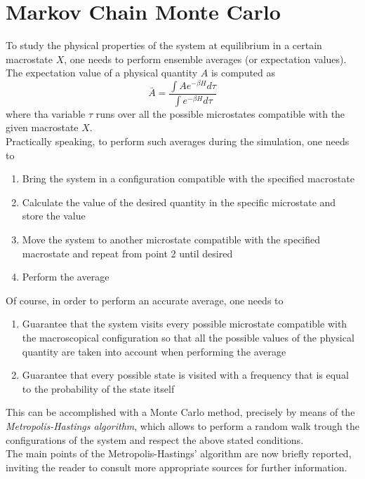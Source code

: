 \section{Markov Chain Monte Carlo}
\label{sec:MCMC}
To study the physical properties of the system at equilibrium in a certain macrostate $X$, one needs to perform ensemble averages (or expectation values). The expectation value of a physical quantity $A$ is computed as 
\begin{equation}
    \bar A = \frac{\int A e^{-\beta H} d\tau}{\int e^{-\beta H} d \tau}
    \label{eq:averageval}
\end{equation}
where tha variable $\tau$ runs over all the possible microstates compatible with the given macrostate $X$. \\
Practically speaking, to perform such averages during the simulation, one needs to
\begin{enumerate}
    \item Bring the system in a configuration compatible with the specified macrostate 
    \item Calculate the value of the desired quantity in the specific microstate and store the value
    \item Move the system to another microstate compatible with the specified macrostate and repeat from point 2 until desired
    \item Perform the average
\end{enumerate}
Of course, in order to perform an accurate average, one needs to 
\begin{enumerate}
    \item Guarantee that the system visits every possible microstate compatible with the macroscopical configuration so that all the possible values of the physical quantity are taken into account when performing the average
    \item Guarantee that every possible state is visited with a frequency that is equal to the probability of the state itself
\end{enumerate}
This can be accomplished with a Monte Carlo method, precisely by means of the \emph{Metropolis-Hastings algorithm}, which allows to perform a random walk trough the configurations of the system and respect the above stated conditions. \\
The main points of the Metropolis-Hastings' algorithm are now briefly reported, inviting the reader to consult more appropriate sources for further information. \par
\vspace{10pt}

